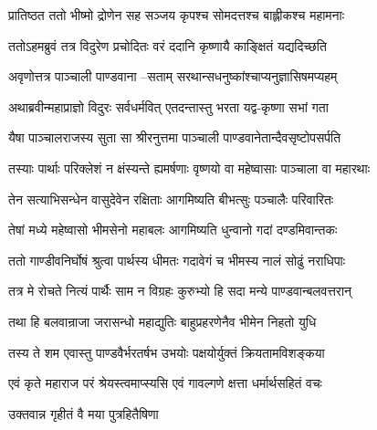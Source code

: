 \twolineshloka
{प्रातिष्ठत ततो भीष्मो द्रोणेन सह सञ्जय}
{कृपश्च सोमदत्तश्च बाह्लीकश्च महामनाः}


\twolineshloka
{ततोऽहमब्रुवं तत्र विदुरेण प्रचोदितः}
{वरं ददानि कृष्णायै काङ्क्षितं यद्यदिच्छति}


\twolineshloka
{अवृणोत्तत्र पाञ्चाली पाण्डवाना --सताम्}
{सरथान्सधनुष्कांश्चाप्यनुज्ञासिषमप्यहम्}


\twolineshloka
{अथाब्रवीन्महाप्राज्ञो विदुरः सर्वधर्मवित्}
{एतदन्तास्तु भरता यद्व-कृष्णा सभां गता}


\twolineshloka
{यैषा पाञ्चालराजस्य सुता सा श्रीरनुत्तमा}
{पाञ्चाली पाण्डवानेतान्दैवसृष्टोपसर्पति}


\twolineshloka
{तस्याः पार्थाः परिक्लेशं न क्षंस्यन्ते ह्यमर्षणाः}
{वृष्णयो वा महेष्वासाः पाञ्चाला वा महारथाः}


\twolineshloka
{तेन सत्याभिसन्धेन वासुदेवेन रक्षिताः}
{आगमिष्यति बीभत्सुः पञ्चालैः परिवारितः}


\twolineshloka
{तेषां मध्ये महेष्वासो भीमसेनो महाबलः}
{आगमिष्यति धुन्वानो गदां दण्डमिवान्तकः}


\twolineshloka
{ततो गाण्डीवनिर्घोषं श्रुत्वा पार्थस्य धीमतः}
{गदावेगं च भीमस्य नालं सोढुं नराधिपाः}


\twolineshloka
{तत्र मे रोचते नित्यं पार्थैः साम न विग्रहः}
{कुरुभ्यो हि सदा मन्ये पाण्डवान्बलवत्तरान्}


\threelineshloka
{तथा हि बलवान्राजा जरासन्धो महाद्युतिः}
{बाहुप्रहरणेनैव भीमेन निहतो युधि}
{}


\twolineshloka
{तस्य ते शम एवास्तु पाण्डवैर्भरतर्षभ}
{उभयोः पक्षयोर्युक्तं क्रियतामविशङ्कया}


\twolineshloka
{एवं कृते महाराज परं श्रेयस्त्वमाप्स्यसि}
{एवं गावल्गणे क्षत्ता धर्मार्थसहितं वचः}


उक्तवान्न गृहीतं वै मया पुत्रहितैषिणा
